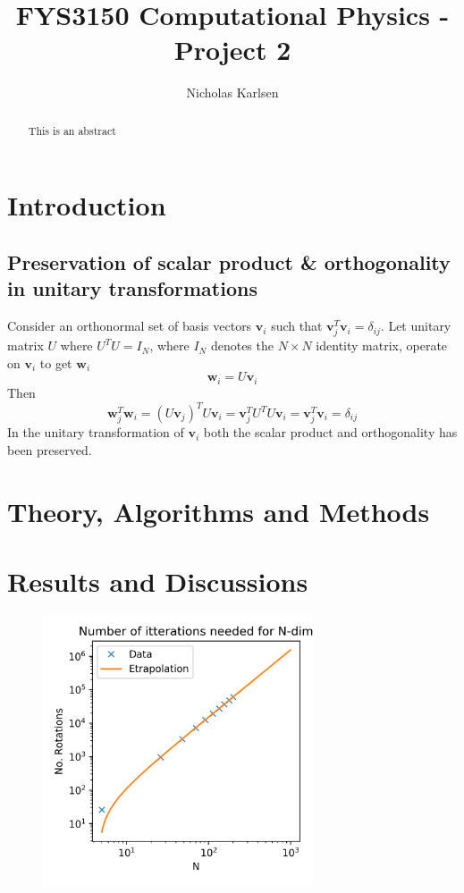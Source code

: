\documentclass[10pt,showpacs,preprintnumbers,footinbib,amsmath,amssymb,aps,prl,twocolumn,groupedaddress,superscriptaddress,showkeys]{revtex4-1}
\begin{document}
\title{FYS3150 Computational Physics - Project 2}
\author{Nicholas Karlsen}

\begin{abstract}
  This is an abstract
\end{abstract}

\maketitle

\section{Introduction}
  \subsection{Preservation of scalar product \& orthogonality in unitary transformations}
    Consider an orthonormal set of basis vectors $\mathbf v_i$ such that $\mathbf v_j^T \mathbf v_i = \delta_{ij}$. Let unitary matrix $U$ where $U^T U= I_N$, where $I_N$ denotes the $N\times N$ identity matrix, operate on $\mathbf v_i$ to get $\mathbf w_i$
    \begin{equation}
      \mathbf w_i = U \mathbf v_i
    \end{equation}
    Then
    \begin{equation}
      \mathbf w_j^T\mathbf w_i = (U\mathbf v_j)^TU\mathbf v_i = \mathbf v_j^T U^T U \mathbf v_i
      = \mathbf v_j^T \mathbf v_i = \delta_{ij}
    \end{equation}
    In the unitary transformation of $\mathbf v_i$ both the scalar product and orthogonality has been preserved.
\section{Theory, Algorithms and Methods}
\section{Results and Discussions}
  \begin{figure}
    \center
    \includegraphics[width=8cm]{figs/norots.png}
  \end{figure}
\end{document}
